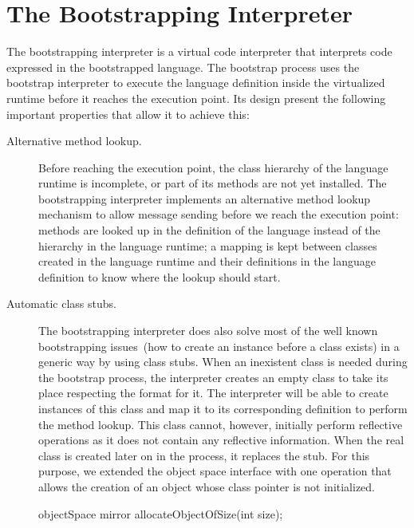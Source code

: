 \section{The Bootstrapping Interpreter}\label{sec:ast_interpreter}

The bootstrapping interpreter is a virtual code interpreter that interprets code expressed in the bootstrapped language. The bootstrap process uses the bootstrap interpreter to execute the language definition inside the virtualized runtime before it reaches the execution point. Its design present the following important properties that allow it to achieve this:

\begin{description}
\item[Alternative method lookup.] Before reaching the execution point, the class hierarchy of the language runtime is incomplete, or part of its methods are not yet installed. The bootstrapping interpreter implements an alternative method lookup mechanism to allow message sending before we reach the execution point: methods are looked up in the definition of the language instead of the hierarchy in the language runtime; a mapping is kept between classes created in the language runtime and their definitions in the language definition to know where the lookup should start.

\item[Automatic class stubs.] The bootstrapping interpreter does also solve most of the well known bootstrapping issues~(\eg how to create an instance before a class exists) in a generic way by using class stubs. When an inexistent class is needed during the bootstrap process, the interpreter creates an empty class to take its place respecting the \VM format for it. The interpreter will be able to create instances of this class and map it to its corresponding definition to perform the method lookup. This class cannot, however, initially perform reflective operations as it does not contain any reflective information. When the real class is created later on in the process, it replaces the stub. For this purpose, we extended the object space interface with one operation that allows the creation of an object whose class pointer is not initialized.

\begin{code}
objectSpace {
    mirror allocateObjectOfSize(int size);
}
\end{code}

\end{description}

